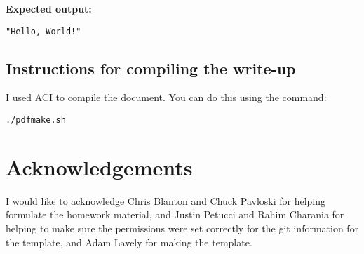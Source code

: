 \documentclass{article}
\begin{document}
\begin{spacing}{1.1}
\textbf{Expected output:}
\begin{verbatim}
"Hello, World!"
\end{verbatim}

\subsection{Instructions for compiling the write-up}

I used ACI to compile the document. You can do this using the command:
\begin{verbatim}
./pdfmake.sh
\end{verbatim}

\section{Acknowledgements}

I would like to acknowledge Chris Blanton and Chuck Pavloski for helping formulate the homework material, and Justin Petucci and Rahim Charania for helping to make sure the permissions were set correctly for the git information for the template, and Adam Lavely for making the template. 




\end{spacing}
\end{document}
